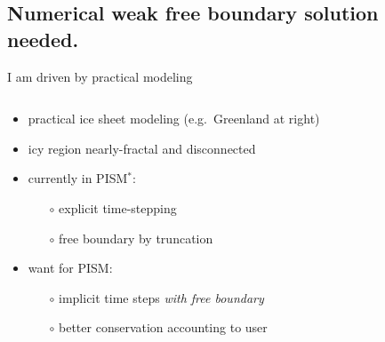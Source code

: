 \documentclass{beamer}
\begin{document}
\subsection{Numerical weak free boundary solution needed.}

\begin{frame}{I am driven by practical modeling}

\begin{columns}
\begin{column}{0.5\textwidth}
\begin{itemize}
\small
\item practical ice sheet modeling (e.g.~Greenland at right)
\item icy region nearly-fractal and disconnected
\item currently in PISM$^*$:
  \begin{itemize}
  \item[$\circ$] explicit time-stepping
  \item[$\circ$] free boundary by truncation
  \end{itemize}
\item want for PISM:
  \begin{itemize}
  \item[$\circ$] implicit time steps \emph{with free boundary}
  \item[$\circ$] better conservation accounting to user
  \end{itemize}
\end{itemize}


\end{column}
\end{columns}
\end{frame}
\end{document}
